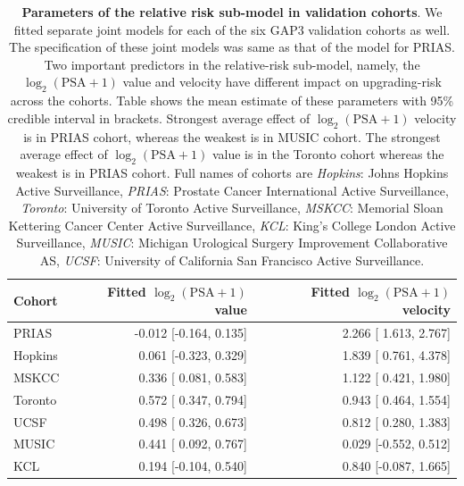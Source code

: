 \begin{subappendices}
\begin{table}
\small
\centering
\caption{\textbf{Parameters of the relative risk sub-model in validation cohorts}. We fitted separate joint models for each of the six GAP3 validation cohorts as well. The specification of these joint models was same as that of the model for PRIAS. Two important predictors in the relative-risk sub-model, namely, the $\log_2 (\mbox{PSA} + 1)$ value and velocity have different impact on upgrading-risk across the cohorts. Table shows the mean estimate of these parameters with 95\% credible interval in brackets. Strongest average effect of $\log_2 (\mbox{PSA} + 1)$ velocity is in PRIAS cohort, whereas the weakest is in MUSIC cohort. The strongest average effect of $\log_2 (\mbox{PSA} + 1)$ value is in the Toronto cohort whereas the weakest is in PRIAS cohort. Full names of cohorts are \textit{Hopkins}: Johns Hopkins Active Surveillance, \textit{PRIAS}: Prostate Cancer International Active Surveillance, \textit{Toronto}: University of Toronto Active Surveillance, \textit{MSKCC}: Memorial Sloan Kettering Cancer Center Active Surveillance, \textit{KCL}: King's College London Active Surveillance, \textit{MUSIC}: Michigan Urological Surgery Improvement Collaborative AS, \textit{UCSF}: University of California San Francisco Active Surveillance.}
\label{c5:tab:PSA_survival_gap3}
\begin{tabular}{lrr}
\hline
Cohort & Fitted $\log_2 (\mbox{PSA} + 1)$ value & Fitted $\log_2 (\mbox{PSA} + 1)$ velocity\\
\hline
PRIAS & -0.012 [-0.164, 0.135] & 2.266 [ 1.613, 2.767]\\
Hopkins & 0.061 [-0.323, 0.329] & 1.839 [ 0.761, 4.378]\\
MSKCC & 0.336 [ 0.081, 0.583] & 1.122 [ 0.421, 1.980]\\
Toronto & 0.572 [ 0.347, 0.794] & 0.943 [ 0.464, 1.554]\\
UCSF & 0.498 [ 0.326, 0.673] & 0.812 [ 0.280, 1.383]\\
MUSIC & 0.441 [ 0.092, 0.767] & 0.029 [-0.552, 0.512]\\
KCL &  0.194 [-0.104, 0.540] & 0.840 [-0.087, 1.665]\\
\hline
\end{tabular}
\end{table}


\end{subappendices}
